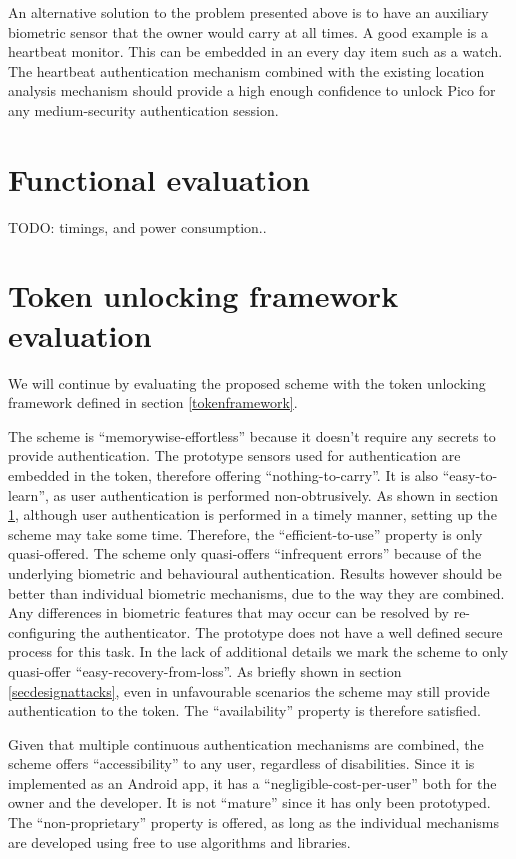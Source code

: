 An alternative solution to the problem presented above is to have an auxiliary biometric sensor that the owner would carry at all times. A good example is a heartbeat monitor. This can be embedded in an every day item such as a watch. The heartbeat authentication mechanism combined with the existing location analysis mechanism should provide a high enough confidence to unlock Pico for any medium-security authentication session.

\section{Functional evaluation}
\label{functionaleval}
TODO: timings, and power consumption..

\section{Token unlocking framework evaluation}
We will continue by evaluating the proposed scheme with the token unlocking framework defined in section \ref{tokenframework}. 

The scheme is ``memorywise-effortless'' because it doesn't require any secrets to provide authentication. The prototype sensors used for authentication are embedded in the token, therefore offering ``nothing-to-carry''. It is also ``easy-to-learn'', as user authentication is performed non-obtrusively. As shown in section \ref{functionaleval}, although user authentication is performed in a timely manner, setting up the scheme may take some time. Therefore, the ``efficient-to-use'' property is only quasi-offered.  The scheme only quasi-offers ``infrequent errors'' because of the underlying biometric and behavioural authentication. Results however should be better than individual biometric mechanisms, due to the way they are combined. Any differences in biometric features that may occur can be resolved by re-configuring the authenticator. The prototype does not have a well defined secure process for this task. In the lack of additional details we mark the scheme to only quasi-offer ``easy-recovery-from-loss''. As briefly shown in section \ref{secdesignattacks}, even in unfavourable scenarios the scheme may still provide authentication to the token. The ``availability'' property is therefore satisfied.

Given that multiple continuous authentication mechanisms are combined, the scheme offers ``accessibility'' to any user, regardless of disabilities. Since it is implemented as an Android app, it has a ``negligible-cost-per-user'' both for the owner and the developer. It is not ``mature'' since it has only been prototyped. The ``non-proprietary'' property is offered, as long as the individual mechanisms are developed using free to use algorithms and libraries.


